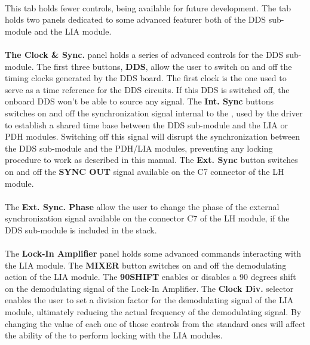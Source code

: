 \paragraph{} This tab holds fewer controls, being available for future development. The tab holds two panels dedicated to some advanced featurer both of the DDS sub-module and the LIA module.

\paragraph{} \textbf{The Clock \& Sync.} panel holds a series of advanced controls for the DDS sub-module.
\newline The first three buttons, \textbf{DDS}, allow the user to switch on and off the timing clocks generated by the DDS board. The first clock is the one used to serve as a time reference for the DDS circuits. If this DDS is switched off, the onboard DDS won't be able to source any signal.
\newline The \textbf{Int. Sync} buttons switches on and off the synchronization signal internal to the \QubeModel , used by the driver to establish a shared time base between the DDS sub-module and the LIA or PDH modules. Switching off this signal will disrupt the synchronization between the DDS sub-module and the PDH/LIA modules, preventing any locking procedure to work as described in this manual.
\newline The \textbf{Ext. Sync} button switches on and off the \textbf{SYNC OUT} signal available on the C7 connector of the LH module.

\paragraph{} The \textbf{Ext. Sync. Phase} allow the user to change the phase of the external synchronization signal available on the connector C7 of the LH module, if the DDS sub-module is included in the \QubeModel  stack.

\paragraph{} The \textbf{Lock-In Amplifier} panel holds some advanced commands interacting with the LIA module.
\newline The \textbf{MIXER} button switches on and off the demodulating action of the LIA module.
\newline The \textbf{90\degree SHIFT} enables or disables a 90 degrees shift on the demodulating signal of the Lock-In Amplifier.
\newline The \textbf{Clock Div.} selector enables the user to set a division factor for the demodulating signal of the LIA module, ultimately reducing the actual frequency of the demodulating signal.
\newline By changing the value of each one of those controls from the standard ones will affect the ability of the \QubeModel  to perform locking with the LIA modules.
\fi